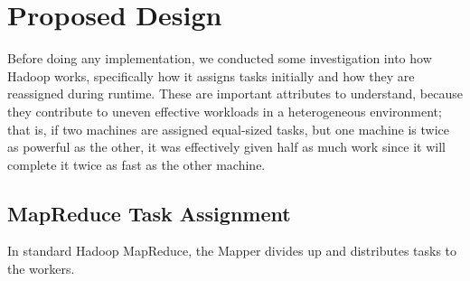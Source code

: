 \section{Proposed Design}
\label{section:propeseddesign}

Before doing any implementation, we conducted some investigation into how Hadoop works, 
specifically how it assigns tasks initially and how they are reassigned during runtime.
These are important attributes to understand, because they contribute to uneven effective
workloads in a heterogeneous environment; that is, if two machines are assigned equal-sized
tasks, but one machine is twice as powerful as the other, it was effectively given half as
much work since it will complete it twice as fast as the other machine.

\subsection{MapReduce Task Assignment}
In standard Hadoop MapReduce, the Mapper divides up and distributes tasks to the workers.
